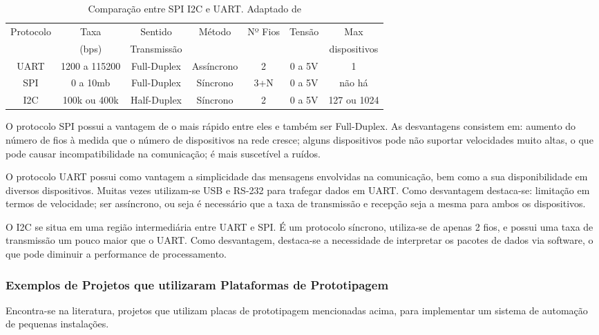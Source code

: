 		\begin{table}[!htb]
			\centering
			\captionsetup{justification=centering}
			\caption[Comparação entre SPI I2C e UART.]{Comparação entre SPI I2C e UART. Adaptado de \textcite{robocore}}
			\label{tbl:comparativo_protocolos}
			\def\arraystretch{1.5}
			\begin{tabular}{c c c c c c c}
				Protocolo & Taxa & Sentido & Método & Nº Fios & Tensão & Max \\ 
				& (bps)& Transmissão & & & & dispositivos \\ \hline
				UART & 1200 a 115200 & Full-Duplex & Assíncrono & 2 & 0 a 5V & 1 \\
				SPI & 0 a 10mb & Full-Duplex & Síncrono & 3+N & 0 a 5V & não há \\
				I2C & 100k ou 400k & Half-Duplex & Síncrono & 2 & 0 a 5V & 127 ou 1024 \\
				\hline
			\end{tabular}
		\end{table}
	
		O protocolo SPI possui  a vantagem de o mais rápido entre eles e também ser Full-Duplex. As desvantagens consistem em: aumento do número de fios à medida que o número de dispositivos na rede cresce; alguns dispositivos pode não suportar velocidades muito altas, o que pode causar incompatibilidade na comunicação; é mais suscetível a ruídos.
		
		O protocolo UART possui como vantagem a simplicidade das mensagens envolvidas na comunicação, bem como a sua disponibilidade em diversos dispositivos. Muitas vezes utilizam-se USB e RS-232 para trafegar dados em UART. Como desvantagem destaca-se: limitação em termos de velocidade; ser assíncrono, ou seja é necessário que a taxa de transmissão e recepção seja a mesma para ambos os dispositivos.
		
		O I2C se situa em uma região intermediária entre UART e SPI. É um protocolo síncrono, utiliza-se de apenas 2 fios, e possui uma taxa de transmissão um pouco maior que o UART. Como desvantagem, destaca-se a necessidade de interpretar os pacotes de dados via software, o que pode diminuir a performance de processamento.
		
		\subsubsection{Exemplos de Projetos que utilizaram Plataformas de Prototipagem}
			Encontra-se na literatura, projetos que utilizam placas de prototipagem mencionadas acima, para implementar um sistema de automação de pequenas instalações.
			
